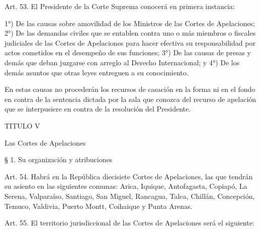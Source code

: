     Art. 53. El Presidente de la Corte Suprema conocerá en primera instancia:

    1°) De las causas sobre amovilidad de los Ministros de las Cortes de Apelaciones;
    2°) De las demandas civiles que se entablen contra uno o más miembros o fiscales judiciales de las Cortes de Apelaciones para hacer efectiva su responsabilidad por actos cometidos en el desempeño de sus funciones;
    3°) De las causas de presas y demás que deban juzgarse con arreglo al Derecho Internacional; y
    4°) De los demás asuntos que otras leyes entreguen a su conocimiento.

    En estas causas no procederán los recursos de casación en la forma ni en el fondo en contra de la sentencia dictada por la sala que conozca del recurso de apelación que se interpusiere en contra de la resolución del Presidente.



    TITULO V

    Las Cortes de Apelaciones


    § 1. Su organización y atribuciones


    Art. 54. Habrá en la República diecisiete Cortes de Apelaciones, las que tendrán su asiento en las siguientes comunas: Arica, Iquique, Antofagasta, Copiapó, La Serena, Valparaíso, Santiago, San Miguel, Rancagua, Talca, Chillán, Concepción, Temuco, Valdivia, Puerto Montt, Coihaique y Punta Arenas.



    Art. 55. El territorio jurisdiccional de las Cortes de Apelaciones será el siguiente:

